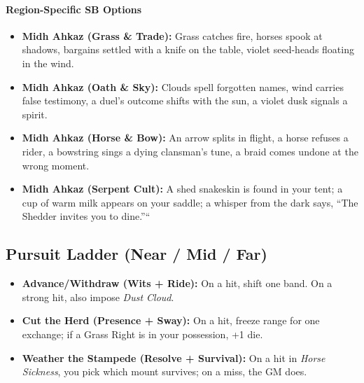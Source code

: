 {{\paragraph{Region-Specific SB Options}
\begin{itemize}
\item \textbf{Midh Ahkaz (Grass \& Trade):} Grass catches fire, horses spook at shadows, bargains settled with a knife on the table, violet seed-heads floating in the wind.
\item \textbf{Midh Ahkaz (Oath \& Sky):} Clouds spell forgotten names, wind carries false testimony, a duel's outcome shifts with the sun, a violet dusk signals a spirit.
\item \textbf{Midh Ahkaz (Horse \& Bow):} An arrow splits in flight, a horse refuses a rider, a bowstring sings a dying clansman's tune, a braid comes undone at the wrong moment.
\item \textbf{Midh Ahkaz (Serpent Cult):} A shed snakeskin is found in your tent; a cup of warm milk appears on your saddle; a whisper from the dark says, ``The Shedder invites you to dine.''``
\end{itemize}

\subsection*{Pursuit Ladder (Near / Mid / Far)}
\begin{itemize}
\item \textbf{Advance/Withdraw (Wits + Ride):} On a hit, shift one band. On a strong hit, also impose \emph{Dust Cloud}.
\item \textbf{Cut the Herd (Presence + Sway):} On a hit, freeze range for one exchange; if a Grass Right is in your possession, +1 die.
\item \textbf{Weather the Stampede (Resolve + Survival):} On a hit in \emph{Horse Sickness}, you pick which mount survives; on a miss, the GM does.
\end{itemize}

}}
